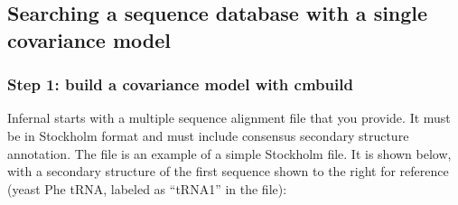 \subsection{Searching a sequence database with a single covariance model}

\subsubsection{Step 1: build a covariance model with cmbuild}

Infernal starts with a multiple sequence alignment file that you
provide. It must be in Stockholm format and must include consensus
secondary structure annotation. The file  is
an example of a simple Stockholm file. It is shown below, with a
secondary structure of the first sequence shown to the right for
reference (yeast Phe tRNA, labeled as ``tRNA1'' in the file):

